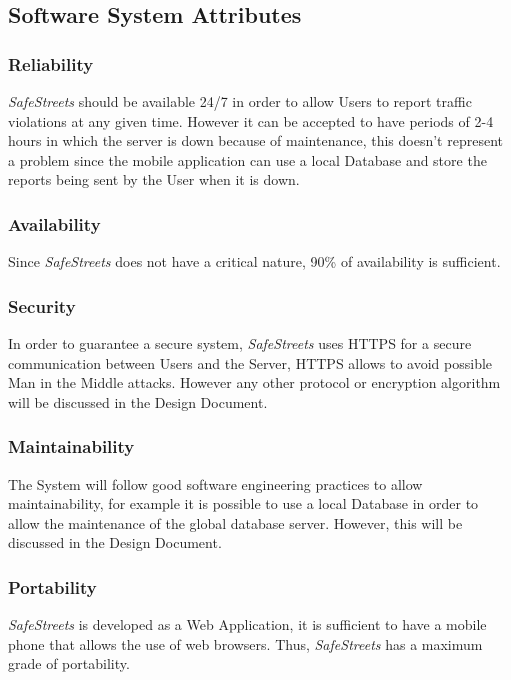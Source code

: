 \subsection{Software System Attributes}

\subsubsection{Reliability}
\textit{SafeStreets} should be available 24/7 in order to allow Users to report traffic violations at any given time. However it can be accepted to have periods of 2-4 hours in which the server is down because of maintenance, this doesn't represent a problem since the mobile application can use a local Database and store the reports being sent by the User when it is down.
\subsubsection{Availability}
Since \textit{SafeStreets} does not have a critical nature, 90\% of availability is sufficient.
\subsubsection{Security}
In order to guarantee a secure system, \textit{SafeStreets} uses HTTPS for a secure communication between Users and the Server, HTTPS allows to avoid possible Man in the Middle attacks. However any other protocol or encryption algorithm will be discussed in the Design Document.
\subsubsection{Maintainability}
The System will follow good software engineering practices to allow maintainability, for example it is possible to use a local Database in order to allow the maintenance of the global database server. However, this will be discussed in the Design Document.
\subsubsection{Portability}
\textit{SafeStreets} is developed as a Web Application, it is sufficient to have a mobile phone that allows the use of web browsers. Thus, \textit{SafeStreets} has a maximum grade of portability.
